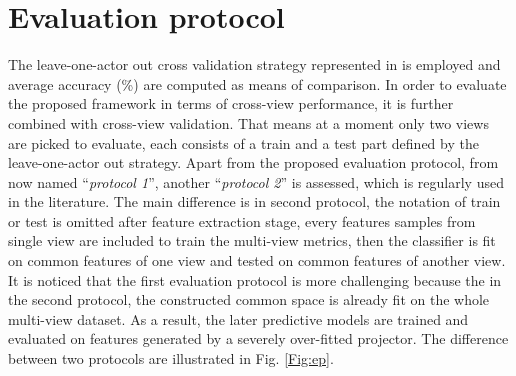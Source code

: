 
\section{Evaluation protocol}
    The leave-one-actor out cross validation strategy represented in \cite{Stone1974} is employed and average accuracy (\%) are computed as means of comparison.
    In order to evaluate the proposed framework in terms of cross-view performance, it is further combined with cross-view validation.
    That means at a moment only two views are picked to evaluate, each consists of a train and a test part defined by the leave-one-actor out strategy.
    Apart from the proposed evaluation protocol, from now named ``\emph{protocol 1}'', another ``\emph{protocol 2}'' is assessed, which is regularly used in the literature.
    The main difference is in second protocol, the notation of train or test is omitted after feature extraction stage, every features samples from single view are included to train the multi-view metrics, then the classifier is fit on common features of one view and tested on common features of another view.
    It is noticed that the first evaluation protocol is more challenging because the in the second protocol, the constructed common space is already fit on the whole multi-view dataset. As a result, the later predictive models are trained and evaluated on features generated by a severely over-fitted projector. %
    The difference between two protocols are illustrated in Fig. \ref{Fig:ep}. 


